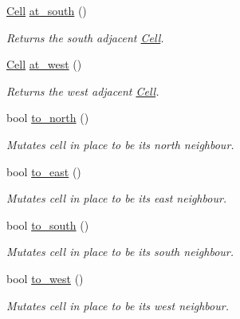 \begin{DoxyCompactItemize}
\hyperlink{classmaze_1_1Cell}{Cell} \hyperlink{classmaze_1_1Cell_a3b188f082fad9e2d67fe044d80889936}{at\+\_\+south} ()
\begin{DoxyCompactList}\small\item\em Returns the south adjacent \hyperlink{classmaze_1_1Cell}{Cell}. \end{DoxyCompactList}\item 
\hyperlink{classmaze_1_1Cell}{Cell} \hyperlink{classmaze_1_1Cell_a4080c57302de14134648c386f3798428}{at\+\_\+west} ()
\begin{DoxyCompactList}\small\item\em Returns the west adjacent \hyperlink{classmaze_1_1Cell}{Cell}. \end{DoxyCompactList}\item 
bool \hyperlink{classmaze_1_1Cell_ad7a2a4199240e33f5eca151e5ad123be}{to\+\_\+north} ()
\begin{DoxyCompactList}\small\item\em Mutates cell in place to be its north neighbour. \end{DoxyCompactList}\item 
bool \hyperlink{classmaze_1_1Cell_a995ff6967a9fe6a8ece294172b6c1d9d}{to\+\_\+east} ()
\begin{DoxyCompactList}\small\item\em Mutates cell in place to be its east neighbour. \end{DoxyCompactList}\item 
bool \hyperlink{classmaze_1_1Cell_ad9ad8cbb20515ba73c92544adb3cdafd}{to\+\_\+south} ()
\begin{DoxyCompactList}\small\item\em Mutates cell in place to be its south neighbour. \end{DoxyCompactList}\item 
bool \hyperlink{classmaze_1_1Cell_a388cb1fd37b00e05980c08ef55b82748}{to\+\_\+west} ()
\begin{DoxyCompactList}\small\item\em Mutates cell in place to be its west neighbour. \end{DoxyCompactList}\end{DoxyCompactItemize}
